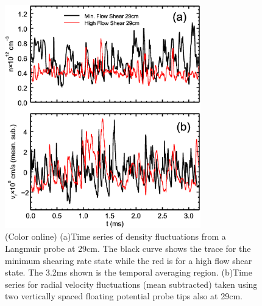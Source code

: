\documentclass[aip,pop,amsmath,amssymb,preprint,superscriptaddress]{revtex4-1} %
\begin{document}
\begin{figure}[!htbp]
\centerline{
\includegraphics[width=8.5cm]{figure2.eps}}
\caption{\label{fig:timeseries} (Color online) (a)Time series of density fluctuations from a Langmuir probe at 29cm. The black curve shows the trace for the minimum shearing rate state while the red is for a high flow shear state. The 3.2ms shown is the temporal averaging region. (b)Time series for radial velocity fluctuations (mean subtracted) taken using two vertically spaced floating potential probe tips also at 29cm.}
\end{figure}
\end{document}
